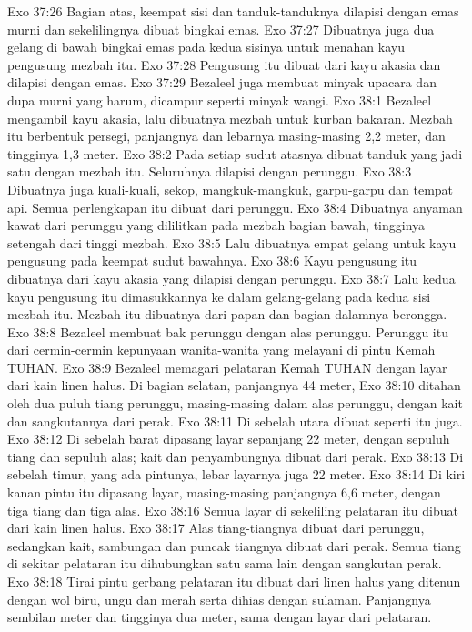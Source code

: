 Exo 37:26  Bagian atas, keempat sisi dan tanduk-tanduknya dilapisi dengan emas murni dan sekelilingnya dibuat bingkai emas.
Exo 37:27  Dibuatnya juga dua gelang di bawah bingkai emas pada kedua sisinya untuk menahan kayu pengusung mezbah itu.
Exo 37:28  Pengusung itu dibuat dari kayu akasia dan dilapisi dengan emas.
Exo 37:29  Bezaleel juga membuat minyak upacara dan dupa murni yang harum, dicampur seperti minyak wangi.
Exo 38:1  Bezaleel mengambil kayu akasia, lalu dibuatnya mezbah untuk kurban bakaran. Mezbah itu berbentuk persegi, panjangnya dan lebarnya masing-masing 2,2 meter, dan tingginya 1,3 meter.
Exo 38:2  Pada setiap sudut atasnya dibuat tanduk yang jadi satu dengan mezbah itu. Seluruhnya dilapisi dengan perunggu.
Exo 38:3  Dibuatnya juga kuali-kuali, sekop, mangkuk-mangkuk, garpu-garpu dan tempat api. Semua perlengkapan itu dibuat dari perunggu.
Exo 38:4  Dibuatnya anyaman kawat dari perunggu yang dililitkan pada mezbah bagian bawah, tingginya setengah dari tinggi mezbah.
Exo 38:5  Lalu dibuatnya empat gelang untuk kayu pengusung pada keempat sudut bawahnya.
Exo 38:6  Kayu pengusung itu dibuatnya dari kayu akasia yang dilapisi dengan perunggu.
Exo 38:7  Lalu kedua kayu pengusung itu dimasukkannya ke dalam gelang-gelang pada kedua sisi mezbah itu. Mezbah itu dibuatnya dari papan dan bagian dalamnya berongga.
Exo 38:8  Bezaleel membuat bak perunggu dengan alas perunggu. Perunggu itu dari cermin-cermin kepunyaan wanita-wanita yang melayani di pintu Kemah TUHAN.
Exo 38:9  Bezaleel memagari pelataran Kemah TUHAN dengan layar dari kain linen halus. Di bagian selatan, panjangnya 44 meter,
Exo 38:10  ditahan oleh dua puluh tiang perunggu, masing-masing dalam alas perunggu, dengan kait dan sangkutannya dari perak.
Exo 38:11  Di sebelah utara dibuat seperti itu juga.
Exo 38:12  Di sebelah barat dipasang layar sepanjang 22 meter, dengan sepuluh tiang dan sepuluh alas; kait dan penyambungnya dibuat dari perak.
Exo 38:13  Di sebelah timur, yang ada pintunya, lebar layarnya juga 22 meter.
Exo 38:14  Di kiri kanan pintu itu dipasang layar, masing-masing panjangnya 6,6 meter, dengan tiga tiang dan tiga alas.
Exo 38:16  Semua layar di sekeliling pelataran itu dibuat dari kain linen halus.
Exo 38:17  Alas tiang-tiangnya dibuat dari perunggu, sedangkan kait, sambungan dan puncak tiangnya dibuat dari perak. Semua tiang di sekitar pelataran itu dihubungkan satu sama lain dengan sangkutan perak.
Exo 38:18  Tirai pintu gerbang pelataran itu dibuat dari linen halus yang ditenun dengan wol biru, ungu dan merah serta dihias dengan sulaman. Panjangnya sembilan meter dan tingginya dua meter, sama dengan layar dari pelataran.

